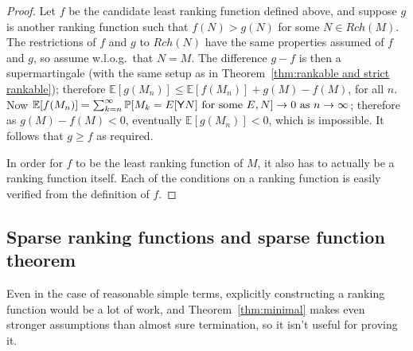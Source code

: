 \begin{proof}
Let $f$ be the candidate least ranking function defined above, and suppose $g$ is another ranking function such that $f(N) > g(N)$ for some $N \in Rch(M)$. The restrictions of $f$ and $g$ to $Rch(N)$ have the same properties assumed of $f$ and $g$, so assume w.l.o.g.~that $N=M$. The difference $g - f$ is then a supermartingale (with the same setup as in 
Theorem~\ref{thm:rankable and strict rankable});
therefore $\mathbb E[g(M_n)] \leq \mathbb E[f(M_n)] + g(M)-f(M)$, for all $n$.
Now $\mathbb E[f(M_n)] = \sum_{k=n}^\infty \mathbb P[M_k = E[\mathsf{Y} N] \text{ for some }E, N] \to 0 \text{ as } n \to \infty$; 
therefore as $g(M) - f(M) < 0$, eventually $\mathbb E[g(M_n)] < 0$, which is impossible. 
It follows that $g \geq f$ as required.

In order for $f$ to be the least ranking function of $M$, it also has to actually be a ranking function itself. Each of the conditions on a ranking function is easily verified from the definition of $f$.
\end{proof}


\subsection{Sparse ranking functions and sparse function theorem}
Even in the case of reasonable simple terms, explicitly constructing a ranking function would be a lot of work, and Theorem~\ref{thm:minimal} makes even stronger assumptions than almost sure termination, so it isn't useful for proving it.

